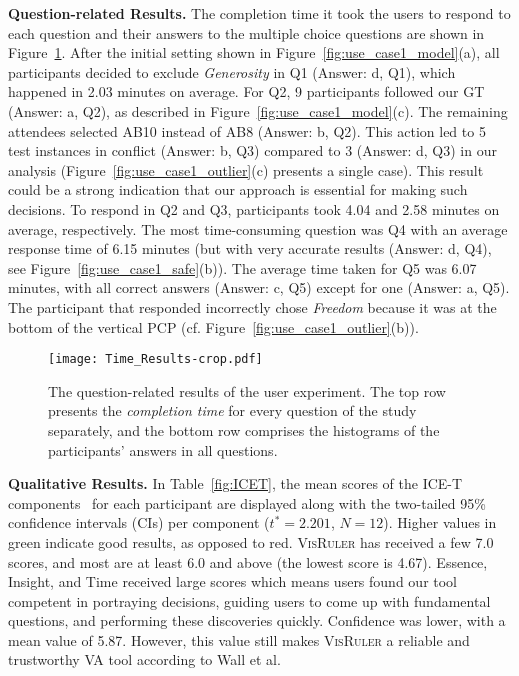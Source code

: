 \textbf{Question-related Results.} The completion time it took the users to respond to each question and their answers to the multiple choice questions are shown in Figure~\ref{fig:results}. After the initial setting shown in Figure~\ref{fig:use_case1_model}(a), all participants decided to exclude \emph{Generosity} in Q1 (Answer: d, Q1), which happened in 2.03 minutes on average. For Q2, 9 participants followed our GT (Answer: a, Q2), as described in Figure~\ref{fig:use_case1_model}(c). The remaining attendees selected AB10 instead of AB8 (Answer: b, Q2). This action led to 5 test instances in conflict (Answer: b, Q3) compared to 3 (Answer: d, Q3) in our analysis (Figure~\ref{fig:use_case1_outlier}(c) presents a single case). This result could be a strong indication that our approach is essential for making such decisions. To respond in Q2 and Q3, participants took 4.04 and 2.58 minutes on average, respectively. The most time-consuming question was Q4 with an average response time of 6.15 minutes (but with very accurate results (Answer: d, Q4), see  Figure~\ref{fig:use_case1_safe}(b)).
%
The average time taken for Q5 was 6.07 minutes, with all correct answers (Answer: c, Q5) except for one (Answer: a, Q5). The participant that responded incorrectly chose \emph{Freedom} because it was at the bottom of the vertical PCP (cf. Figure~\ref{fig:use_case1_outlier}(b)).

\begin{figure}[h]
  \texttt{[image: Time\_Results-crop.pdf]} 
  \caption{The question-related results of the user experiment. The top row presents the \emph{completion time} for every question of the study separately, and the bottom row comprises the histograms of the participants' answers in all questions.}
  \label{fig:results}
\end{figure} 

\textbf{Qualitative Results.} 
In Table~\ref{fig:ICET}, the mean scores of the ICE-T components~\cite{wall2019aheuristic} for each participant are displayed along with the two-tailed 95\% confidence intervals (CIs) per component ($t^* = 2.201$, $N=12$). Higher values in green indicate good results, as opposed to red. \textsc{VisRuler} has received a few 7.0 scores, and most are at least 6.0 and above (the lowest score is 4.67). Essence, Insight, and Time received large scores which means users found our tool competent in portraying decisions, guiding users to come up with fundamental questions, and performing these discoveries quickly. Confidence was lower, with a mean value of 5.87. However, this value still makes \textsc{VisRuler} a reliable and trustworthy VA tool according to Wall et al.~\cite{wall2019aheuristic}

